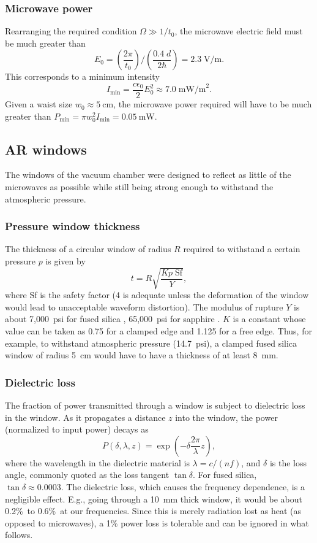 \subsubsection{Microwave power}

Rearranging the required condition $\Omega\gg1/t_0$, the microwave electric
field must be much greater than
%
\[
    E_0=
    \left(\frac{2\pi}{t_0}\right)
    /
    \left(\frac{0.4\;d}{2\hbar}\right)
    =2.3\;\text{V/m}.
\]
%
This corresponds to a minimum intensity
%
\[
    I_\text{min}=\frac{c\epsilon_0}{2}E_0^2\approx7.0\;\text{mW/m}^2.
\]
%
Given a waist size $w_0\approx5~\text{cm}$, the microwave power required will
have to be much greater than $P_\text{min}=\pi
w_0^2I_\text{min}=0.05~\text{mW}$.

\subsection{AR windows}

The windows of the vacuum chamber were designed to reflect as little of the
microwaves as possible while still being strong enough to withstand the
atmospheric pressure.

\subsubsection{Pressure window thickness}

The thickness of a circular window of radius $R$ required to withstand a certain
pressure $p$ is given by \cite[eqn~4.190]{moore2009building}
%
\[
    t=R\sqrt{\frac{Kp\;\text{Sf}}{Y}},
\]
%
where Sf is the safety factor (4 is adequate unless the deformation of the
window would lead to unacceptable waveform distortion). The modulus of rupture
$Y$ is about 7,000~psi for fused silica \cite{corningFS}, 65,000~psi for
sapphire \cite{sapphireWeb}. $K$ is a constant whose value can be taken as 0.75
for a clamped edge and 1.125 for a free edge.  Thus, for example, to withstand
atmospheric pressure (14.7~psi), a clamped fused silica window of radius 5~cm
would have to have a thickness of at least 8~mm.

\subsubsection{Dielectric loss}

The fraction of power transmitted through a window is subject to dielectric loss
in the window. As it propagates a distance $z$ into the window, the power
(normalized to input power) decays as
%
\[
    P(\delta,\lambda,z)=\exp\left(-\delta\frac{2\pi}{\lambda}z\right),
\]
%
where the wavelength in the dielectric material is $\lambda=c/(nf)$, and
$\delta$ is the loss angle, commonly quoted as the loss tangent $\tan\delta$.
For fused silica, $\tan\delta\approx0.0003$.  The dielectric loss, which causes
the frequency dependence, is a negligible effect. E.g., going through a 10~mm
thick window, it would be about 0.2\%\ to 0.6\%\ at our frequencies.  Since this
is merely radiation lost as heat (as opposed to microwaves), a 1\% power loss is
tolerable and can be ignored in what follows.

